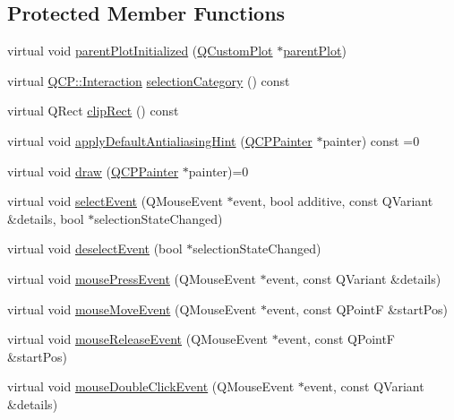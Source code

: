 \subsection*{Protected Member Functions}
\begin{DoxyCompactItemize}
\item 
virtual void \hyperlink{class_q_c_p_layerable_ab20b7dbd8e0249ed61adb9622c427382}{parent\+Plot\+Initialized} (\hyperlink{class_q_custom_plot}{Q\+Custom\+Plot} $\ast$\hyperlink{class_q_c_p_layerable_a473edb813a4c1929d6b6a8fe3ff3faf7}{parent\+Plot})
\item 
virtual \hyperlink{namespace_q_c_p_a2ad6bb6281c7c2d593d4277b44c2b037}{Q\+C\+P\+::\+Interaction} \hyperlink{class_q_c_p_layerable_a908c9edda761886f33893be326dab77d}{selection\+Category} () const
\item 
virtual Q\+Rect \hyperlink{class_q_c_p_layerable_acbcfc9ecc75433747b1978a77b1864b3}{clip\+Rect} () const
\item 
virtual void \hyperlink{class_q_c_p_layerable_afdf83ddc6a265cbf4c89fe99d3d93473}{apply\+Default\+Antialiasing\+Hint} (\hyperlink{class_q_c_p_painter}{Q\+C\+P\+Painter} $\ast$painter) const =0
\item 
virtual void \hyperlink{class_q_c_p_layerable_aecf2f7087482d4b6a78cb2770e5ed12d}{draw} (\hyperlink{class_q_c_p_painter}{Q\+C\+P\+Painter} $\ast$painter)=0
\item 
virtual void \hyperlink{class_q_c_p_layerable_a7498c2d0d081cf7cad0fb3bb93aa0e91}{select\+Event} (Q\+Mouse\+Event $\ast$event, bool additive, const Q\+Variant \&details, bool $\ast$selection\+State\+Changed)
\item 
virtual void \hyperlink{class_q_c_p_layerable_ae546370644a5551c76af739afc008bee}{deselect\+Event} (bool $\ast$selection\+State\+Changed)
\item 
virtual void \hyperlink{class_q_c_p_layerable_af6567604818db90f4fd52822f8bc8376}{mouse\+Press\+Event} (Q\+Mouse\+Event $\ast$event, const Q\+Variant \&details)
\item 
virtual void \hyperlink{class_q_c_p_layerable_a9eee1ba47fd69be111059ca3881933e4}{mouse\+Move\+Event} (Q\+Mouse\+Event $\ast$event, const Q\+PointF \&start\+Pos)
\item 
virtual void \hyperlink{class_q_c_p_layerable_aa0d79b005686f668622bbe66ac03ba2c}{mouse\+Release\+Event} (Q\+Mouse\+Event $\ast$event, const Q\+PointF \&start\+Pos)
\item 
virtual void \hyperlink{class_q_c_p_layerable_a4171e2e823aca242dd0279f00ed2de81}{mouse\+Double\+Click\+Event} (Q\+Mouse\+Event $\ast$event, const Q\+Variant \&details)

\end{DoxyCompactItemize}

